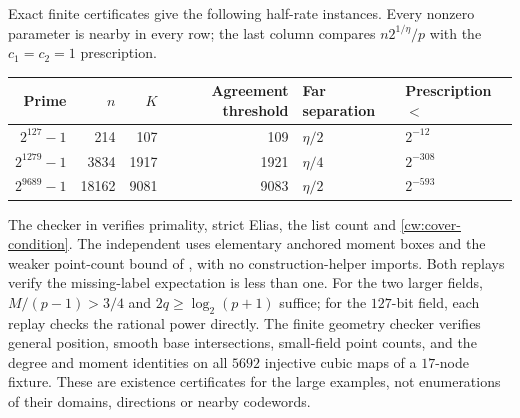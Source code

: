 Exact finite certificates give the following half-rate instances.
Every nonzero parameter is nearby in every row; the last column compares
$n2^{1/\eta}/p$ with the $c_1=c_2=1$ prescription.
\begin{center}
\begin{tabular}{@{}rrrrll@{}}
\toprule
Prime & $n$ & $K$ & Agreement threshold & Far separation & Prescription $<$\\
\midrule
$2^{127}-1$&214&107&109&$\eta/2$&$2^{-12}$\\
$2^{1279}-1$&3834&1917&1921&$\eta/4$&$2^{-308}$\\
$2^{9689}-1$&18162&9081&9083&$\eta/2$&$2^{-593}$\\
\bottomrule
\end{tabular}
\end{center}
The checker  in
 verifies primality, strict Elias,
the list count and \eqref{cw:cover-condition}. The independent
 uses elementary anchored moment boxes
and the weaker point-count bound of \cite[Theorem~5.2]{cafure-matera},
with no construction-helper imports. Both replays verify the missing-label expectation is less than one.
For the two larger fields, $M/(p-1)>3/4$ and
$2q\ge\log_2(p+1)$ suffice; for the $127$-bit field, each replay
checks the rational power directly.
The finite geometry checker verifies general position, smooth base
intersections, small-field point counts, and the degree and moment
identities on all $5692$ injective cubic maps of a $17$-node fixture.
These are existence certificates for the large examples, not enumerations
of their domains, directions or nearby codewords.


